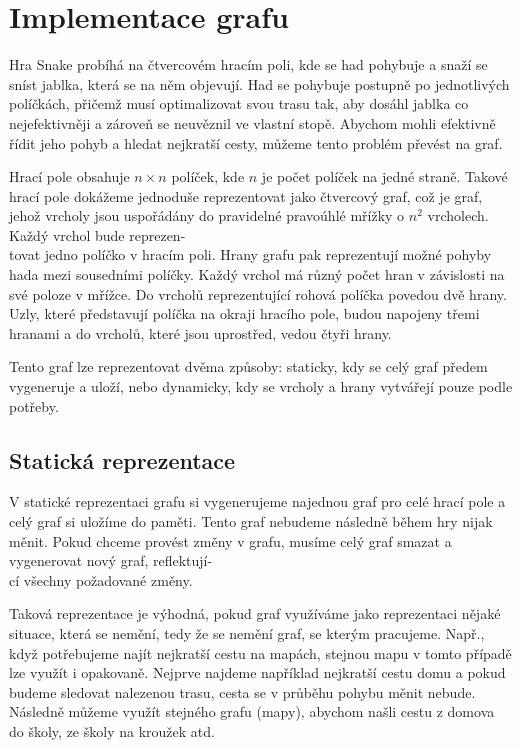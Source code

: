 \chapter{Implementace grafu}\label{Implementace grafu}
Hra Snake probíhá na čtvercovém hracím poli, kde se had pohybuje a snaží se sníst jablka, která se na něm objevují. Had se pohybuje postupně po jednotlivých políčkách, přičemž musí optimalizovat svou trasu tak, aby dosáhl jablka co nejefektivněji a zároveň se neuvěznil ve vlastní stopě. Abychom mohli efektivně řídit jeho pohyb a hledat nejkratší cesty, můžeme tento problém převést na graf. 

Hrací pole obsahuje \(n \times n\) políček, kde \(n\) je počet políček na jedné straně. Takové hrací pole dokážeme jednoduše reprezentovat jako čtvercový graf, což je graf, jehož vrcholy jsou uspořádány do pravidelné pravoúhlé mřížky o \(n^2\) vrcholech. Každý vrchol bude reprezen-\\tovat jedno políčko v hracím poli. Hrany grafu pak reprezentují možné pohyby hada mezi sousedními políčky. Každý vrchol má různý počet hran v závislosti na své poloze v mřížce. Do vrcholů reprezentující rohová políčka povedou dvě hrany. Uzly, které představují políčka na okraji hracího pole, budou napojeny třemi hranami a do vrcholů, které jsou uprostřed, vedou čtyři hrany. 

Tento graf lze reprezentovat dvěma způsoby: staticky, kdy se celý graf předem vygeneruje a uloží, nebo dynamicky, kdy se vrcholy a hrany vytvářejí pouze podle potřeby.

\section{Statická reprezentace}\label{Staticky}
V statické reprezentaci grafu si vygenerujeme najednou graf pro celé hrací pole a celý graf si uložíme do paměti. Tento graf nebudeme následně během hry nijak měnit. Pokud chceme provést změny v grafu, musíme celý graf smazat a vygenerovat nový graf, reflektují-\\ cí všechny požadované změny. 

Taková reprezentace je výhodná, pokud graf využíváme jako reprezentaci nějaké situace, která se nemění, tedy že se nemění graf, se kterým pracujeme. Např., když potřebujeme najít nejkratší cestu na mapách, stejnou mapu v tomto případě lze využít i opakovaně. Nejprve najdeme například nejkratší cestu domu a pokud budeme sledovat nalezenou trasu, cesta se v průběhu pohybu měnit nebude. Následně můžeme využít stejného grafu (mapy), abychom našli cestu z domova do školy, ze školy na kroužek atd. 

